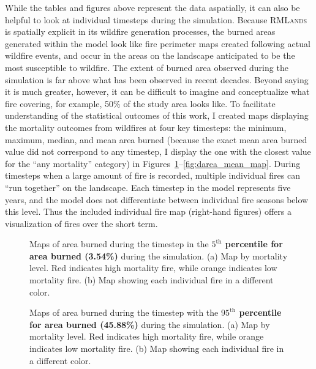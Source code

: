 While the tables and figures above represent the data aspatially, it can also be helpful to look at individual timesteps during the simulation. Because \textsc{RMLands} is spatially explicit in its wildfire generation processes, the burned areas generated within the model look like fire perimeter maps created following actual wildfire events, and occur in the areas on the landscape anticipated to be the most susceptible to wildfire. The extent of burned area observed during the simulation is far above what has been observed in recent decades. Beyond saying it is much greater, however, it can be difficult to imagine and conceptualize what fire covering, for example, 50\% of the study area looks like. To facilitate understanding of the statistical outcomes of this work, I created maps displaying the mortality outcomes from wildfires at four key timesteps: the minimum, maximum, median, and mean area burned (because the exact mean area burned value did not correspond to any timestep, I display the one with the closest value for the ``any mortality'' category) in Figures~\ref{fig:darea_min_map}--\ref{fig:darea_mean_map}. During timesteps when a large amount of fire is recorded, multiple individual fires can ``run together'' on the landscape. Each timestep in the model represents five years, and the model does not differentiate between individual fire seasons below this level. Thus the included individual fire map (right-hand figures) offers a visualization of fires over the short term.


\begin{figure}[!htbp]
  \centering
  \caption{Maps of area burned during the timestep in the \textbf{$5^{\text{th}}$ percentile for area burned (3.54\%)} during the simulation. (a) Map by mortality level. Red indicates high mortality fire, while orange indicates low mortality fire. (b) Map showing each individual fire in a different color.}
  \label{fig:darea_min_map}
\end{figure}

\begin{figure}[!htbp]
  \centering
  \caption{Maps of area burned during the timestep with the \textbf{$95^{\text{th}}$ percentile for area burned (45.88\%)} during the simulation. (a) Map by mortality level. Red indicates high mortality fire, while orange indicates low mortality fire. (b) Map showing each individual fire in a different color.}
  \label{fig:darea_max_map}
\end{figure}

